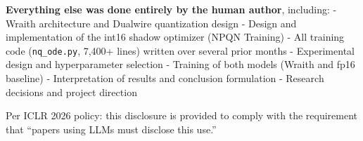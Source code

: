 \textbf{Everything else was done entirely by the human author},
including: - Wraith architecture and Dualwire quantization design -
Design and implementation of the int16 shadow optimizer (NPQN Training)
- All training code (\texttt{nq\_ode.py}, 7,400+ lines) written over
several prior months - Experimental design and hyperparameter selection
- Training of both models (Wraith and fp16 baseline) - Interpretation of
results and conclusion formulation - Research decisions and project
direction

Per ICLR 2026 policy: this disclosure is provided to comply with the
requirement that ``papers using LLMs must disclose this use.''
